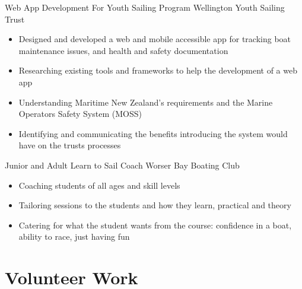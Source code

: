 \documentclass[a4paper]{twentysecondcv} %
\begin{document}
\begin{workexperience}
    {Web App Development For Youth Sailing Program}
    {Wellington Youth Sailing Trust}
    {
        \begin{itemize}
            \item Designed and developed a web and mobile accessible app for tracking boat maintenance issues, and health and safety documentation
            \item Researching existing tools and frameworks to help the development of a web app
            \item Understanding Maritime New Zealand's requirements and the Marine Operators Safety System (MOSS)
            \item Identifying and communicating the benefits introducing the system would have on the trusts processes
        \end{itemize}
    }

    {Junior and Adult Learn to Sail Coach}
    {Worser Bay Boating Club}
    {
        \begin{itemize}
            \item Coaching students of all ages and skill levels
            \item Tailoring sessions to the students and how they learn, practical and theory
            \item Catering for what the student wants from the course: confidence in a boat, ability to race, just having fun
        \end{itemize}
    }

\end{workexperience}


\section{Volunteer Work}

\begin{twentyshort} %
\end{twentyshort}
\end{document}
